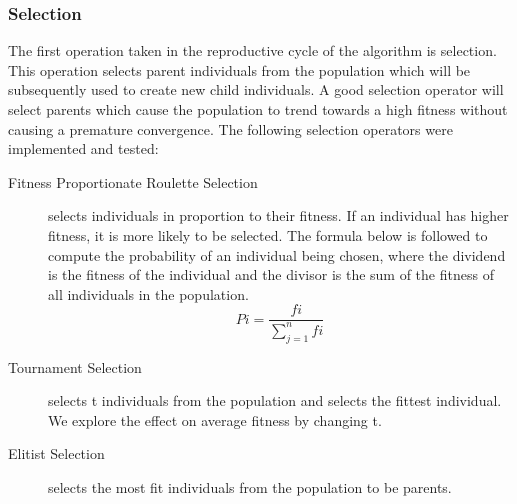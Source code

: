 \documentclass[sigconf]{acmart}
\begin{document}
\subsubsection{Selection}
The first operation taken in the reproductive cycle of the algorithm is selection. This operation selects parent individuals from the population which will be subsequently used to create new child individuals. A good selection operator will select parents which cause the population to trend towards a high fitness without causing a premature convergence. The following selection operators were implemented and tested:
\begin{description}
\item[Fitness Proportionate Roulette Selection] selects individuals in proportion to their fitness. If an individual has higher fitness, it is more likely to be selected. The formula below is followed to compute the probability of an individual being chosen, where the dividend is the fitness of the individual and the divisor is the sum of the fitness of all individuals in the population.  \cite{10.1162/evco.1996.4.4.361}
\begin{equation}
    Pi = \frac{fi}{\sum_{j=1}^{n}fi}
\end{equation}
\item[Tournament Selection] selects t individuals from the population and selects the fittest individual. We explore the effect on average fitness by changing t. \cite{10.1162/evco.1996.4.4.361}
\item[Elitist Selection] selects the most fit individuals from the population to be parents.
\end{description}
\end{document}

